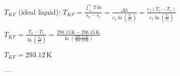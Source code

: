 \( T_{KF} \) (ideal liquid):  
\( T_{KF} = \frac{\int_{s_a}^{s_c} T \, ds}{s_a - s_c} = \frac{\Delta h}{c_f \ln \left( \frac{T_2}{T_1} \right)} = \frac{c_f (T_2 - T_1)}{c_f \ln \left( \frac{T_2}{T_1} \right)} \)  

\( T_{KF} = \frac{T_2 - T_1}{\ln \left( \frac{T_2}{T_1} \right)} = \frac{298.15 \, \text{K} - 288.15 \, \text{K}}{\ln \left( \frac{288.15 \, \text{K}}{288.15 \, \text{K}} \right)} \)  

\( T_{KF} = 293.12 \, \text{K} \)  

---